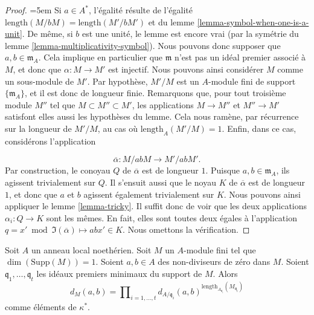 \begin{proof}
{\emergencystretch=5em Si $a \in A^*$, l'égalité résulte de
l'égalité $\text{length}(M/bM) = \text{length}(M'/bM')$
et du lemme \ref{lemma-symbol-when-one-is-a-unit}.
De même, si $b$ est une unité, le lemme est encore vrai
(par la symétrie du lemme \ref{lemma-multiplicativity-symbol}).
Nous pouvons donc supposer que $a, b \in \mathfrak m_A$.
Cela implique en particulier que $\mathfrak m$ n'est pas
un idéal premier associé à $M$, et donc que $\alpha : M \to M'$
est injectif. Nous pouvons ainsi considérer $M$ comme un sous-module de $M'$.
Par hypothèse, $M'/M$ est un $A$-module fini de support
$\{\mathfrak m_A\}$, et il est donc de longueur finie.
Remarquons que, pour tout troisième module $M''$ tel que $M \subset M'' \subset M'$,
les applications $M \to M''$ et $M'' \to M'$ satisfont elles aussi les hypothèses du lemme.
Cela nous ramène, par récurrence sur la longueur de $M'/M$,
au cas où $\text{length}_A(M'/M) = 1$.
Enfin, dans ce cas, considérons l'application\par}
$$
\overline{\alpha} : M/abM \longrightarrow M'/abM'.
$$
Par construction, le conoyau $Q$ de $\overline{\alpha}$ est de
longueur $1$. Puisque $a, b \in \mathfrak m_A$, ils agissent trivialement sur
$Q$. Il s'ensuit aussi que le noyau $K$ de $\overline{\alpha}$ est de
longueur $1$, et donc que $a$ et $b$ agissent également trivialement sur $K$.
Nous pouvons ainsi appliquer le lemme \ref{lemma-tricky}. Il suffit donc de voir
que les deux applications $\alpha_i : Q \to K$ sont les mêmes.
En fait, elles sont toutes deux égales à l'application
$q = x' \bmod \Im(\overline{\alpha}) \mapsto abx' \in K$.
Nous omettons la vérification.
\end{proof}

\begin{lemma}
\label{lemma-compute-symbol-M}
Soit $A$ un anneau local noethérien.
Soit $M$ un $A$-module fini tel que $\dim(\text{Supp}(M)) = 1$.
Soient $a, b \in A$ des non-diviseurs de zéro dans $M$.
Soient $\mathfrak q_1, \ldots, \mathfrak q_t$ les idéaux premiers minimaux
du support de $M$. Alors
$$
d_M(a, b)
=
\prod\nolimits_{i = 1, \ldots, t}
d_{A/\mathfrak q_i}(a, b)^{
\text{length}_{A_{\mathfrak q_i}}(M_{\mathfrak q_i})}
$$
comme éléments de $\kappa^*$.
\end{lemma}

